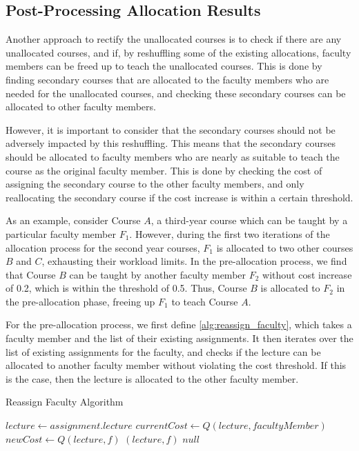 \subsection{Post-Processing Allocation Results}
\label{sec:post_allocation}

Another approach to rectify the unallocated courses is to check if there are any unallocated courses, and if, by reshuffling some of the existing allocations, faculty members can be freed up to teach the unallocated courses. This is done by finding secondary courses that are allocated to the faculty members who are needed for the unallocated courses, and checking these secondary courses can be allocated to other faculty members.

However, it is important to consider that the secondary courses should not be adversely impacted by this reshuffling. This means that the secondary courses should be allocated to faculty members who are nearly as suitable to teach the course as the original faculty member. This is done by checking the cost of assigning the secondary course to the other faculty members, and only reallocating the secondary course if the cost increase is within a certain threshold.

As an example, consider Course $A$, a third-year course which can be taught by a particular faculty member $F_1$. However, during the first two iterations of the allocation process for the second year courses, $F_1$ is allocated to two other courses $B$ and $C$, exhausting their workload limits. In the pre-allocation process, we find that Course $B$ can be taught by another faculty member $F_2$ without cost increase of 0.2, which is within the threshold of 0.5. Thus, Course $B$ is allocated to $F_2$ in the pre-allocation phase, freeing up $F_1$ to teach Course $A$.

For the pre-allocation process, we first define \autoref{alg:reassign_faculty}, which takes a faculty member and the list of their existing assignments. It then iterates over the list of existing assignments for the faculty, and checks if the lecture can be allocated to another faculty member without violating the cost threshold. If this is the case, then the lecture is allocated to the other faculty member.

\begin{algorithm}[H]
  \caption{Reassign Faculty Algorithm}
  \begin{algorithmic}[1]
    \State $lecture \gets assignment.lecture$
    \State $currentCost \gets Q(lecture, facultyMember)$
    \State $newCost \gets Q(lecture, f)$
    \Return $(lecture, f)$
    \EndIf
    \EndFor
    \EndFor
    \State \Return $null$
    \EndProcedure
  \end{algorithmic}
  \label{alg:reassign_faculty}
\end{algorithm}

